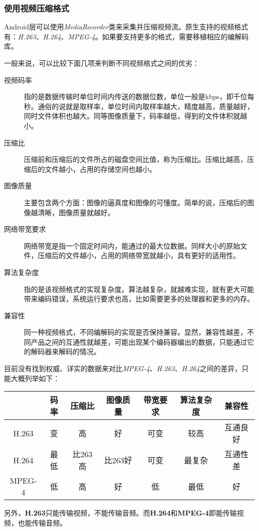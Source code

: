 \documentclass[11pt,a4paper]{article}
\begin{document}
\begin{CJK}{UTF8}{gbsn}
    \subsubsection{使用视频压缩格式}
    Android层可以使用\emph{MediaRecorder}类来采集并压缩视频流。原生支持的视频格式有：\emph{H.263}、\emph{H.264}、\emph{MPEG-4}。如果要支持更多的格式，需要移植相应的编解码库。\par
    一般来说，可以比较下面几项来判断不同视频格式之间的优劣：
    \begin{description}
        \item[视频码率] 指的是数据传输时单位时间内传送的数据位数，单位一般是kbps，即千位每秒。通俗的说就是取样率，单位时间内取样率越大，精度越高，质量越好，同时文件体积也越大。同等图像质量下，码率越低，得到的文件体积就越小。
        \item[压缩比] 压缩前和压缩后的文件所占的磁盘空间比值，称为压缩比。压缩比越高，压缩后的文件越小，占用的存储空间也越小。
        \item[图像质量] 主要包含两个方面：图像的逼真度和图像的可懂度。简单的说，压缩后的图像越清晰，图像质量就越好。
        \item[网络带宽要求] 网络带宽是指一个固定时间内，能通过的最大位数据。同样大小的原始文件，压缩后的文件越小，占用的网络带宽就越小，具有更好的适用性。
        \item[算法复杂度] 指的是该视频格式的实现复杂度。算法越复杂，就越难实现，就有更大可能带来编码错误，系统运行要求也高，比如需要更多的处理器和更多的内存。
        \item[兼容性] 同一种视频格式，不同编解码的实现是否保持兼容。显然，兼容性越差，不同产品之间的互通性就越差，可能出现某个编码器编出的数据，只能通过它的解码器来解码的情况。
    \end{description}
    \par
    目前没有找到权威、详实的数据来对比\emph{MPEG-4}、\emph{H.263}、\emph{H.264}之间的差异，只能大概列举如下：\\
    \begin{tabular}{|c|c|c|c|c|c|c|}
        \hline
        & 码率 & 压缩比 & 图像质量 & 带宽要求 & 算法复杂度 & 兼容性 \\ \hline
        H.263 & 变 & 高 & 好 & 可变 & 较高 & 互通良好 \\ \hline
        H.264 & 最低 & 比263高 & 比263好 & 可变 & 最复杂 & 互通性差 \\ \hline
        MPEG-4 & 低 & 高 & 好 & 低 & 最低 & 好 \\ \hline
    \end{tabular}
    \par
    另外，\textbf{H.263}只能传输视频，不能传输音频。而\textbf{H.264}和\textbf{MPEG-4}即能传输视频，也能传输音频。

\end{CJK}
\end{document}
